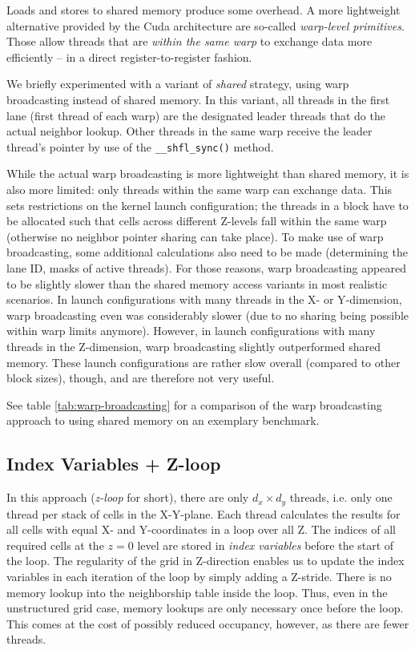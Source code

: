 Loads and stores to shared memory produce some overhead. A more lightweight alternative provided by the Cuda architecture are so-called \emph{warp-level primitives}. Those allow threads that are \emph{within the same warp} to exchange data more efficiently -- in a direct register-to-register fashion.

We briefly experimented with a variant of \emph{shared} strategy, using warp broadcasting instead of shared memory. In this variant, all threads in the first lane (first thread of each warp) are the designated leader threads that do the actual neighbor lookup. Other threads in the same warp receive the leader thread's pointer by use of the \texttt{\_\_shfl\_sync()} method.

While the actual warp broadcasting is more lightweight than shared memory, it is also more limited: only threads within the same warp can exchange data. This sets restrictions on the kernel launch configuration; the threads in a block have to be allocated such that cells across different Z-levels fall within the same warp (otherwise no neighbor pointer sharing can take place). To make use of warp broadcasting, some additional calculations also need to be made (determining the lane ID, masks of active threads). For those reasons, warp broadcasting appeared to be slightly slower than the shared memory access variants in most realistic scenarios. In launch configurations with many threads in the X- or Y-dimension, warp broadcasting even was considerably slower (due to no sharing being possible within warp limits anymore). However, in launch configurations with many threads in the Z-dimension, warp broadcasting slightly outperformed shared memory. These launch configurations are rather slow overall (compared to other block sizes), though, and are therefore not very useful.

See table \ref{tab:warp-broadcasting} for a comparison of the warp broadcasting approach to using shared memory on an exemplary benchmark.

\subsection{Index Variables + Z-loop} In this approach (\emph{z-loop} for short), there are only $d_x\times d_y$ threads, i.e. only one thread per stack of cells in the X-Y-plane. Each thread calculates the results for all cells with equal X- and Y-coordinates in a loop over all Z. The indices of all required cells at the $z=0$ level are stored in \emph{index variables} before the start of the loop. The regularity of the grid in Z-direction enables us to update the index variables in each iteration of the loop by simply adding a Z-stride. There is no memory lookup into the neighborship table inside the loop. Thus, even in the unstructured grid case, memory lookups are only necessary once before the loop. This comes at the cost of possibly reduced occupancy, however, as there are fewer threads.

